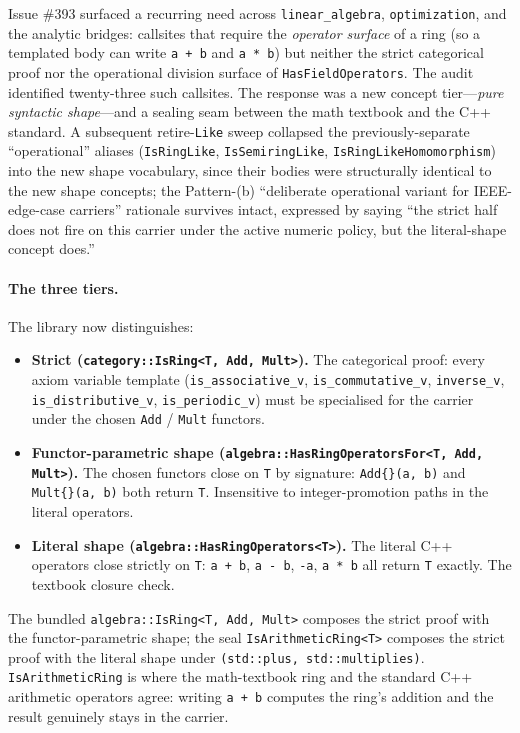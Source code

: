 \documentclass[11pt, a4paper]{report}
\begin{document}
Issue \#393 surfaced a recurring need across \texttt{linear\_algebra}, \texttt{optimization}, and the analytic bridges: callsites that require the \emph{operator surface} of a ring (so a templated body can write \texttt{a + b} and \texttt{a * b}) but neither the strict categorical proof nor the operational division surface of \texttt{HasFieldOperators}. The audit identified twenty-three such callsites. The response was a new concept tier---\emph{pure syntactic shape}---and a sealing seam between the math textbook and the C++ standard. A subsequent retire-\texttt{Like} sweep collapsed the previously-separate ``operational'' aliases (\texttt{IsRingLike}, \texttt{IsSemiringLike}, \texttt{IsRingLikeHomomorphism}) into the new shape vocabulary, since their bodies were structurally identical to the new shape concepts; the Pattern-(b) ``deliberate operational variant for IEEE-edge-case carriers'' rationale survives intact, expressed by saying ``the strict half does not fire on this carrier under the active numeric policy, but the literal-shape concept does.''

\paragraph{The three tiers.} The library now distinguishes:

\begin{itemize}
  \item \textbf{Strict (\texttt{category::IsRing<T, Add, Mult>}).} The categorical proof: every axiom variable template (\texttt{is\_associative\_v}, \texttt{is\_commutative\_v}, \texttt{inverse\_v}, \texttt{is\_distributive\_v}, \texttt{is\_periodic\_v}) must be specialised for the carrier under the chosen \texttt{Add} / \texttt{Mult} functors.
  \item \textbf{Functor-parametric shape (\texttt{algebra::HasRingOperatorsFor<T, Add, Mult>}).} The chosen functors close on \texttt{T} by signature: \texttt{Add\{\}(a, b)} and \texttt{Mult\{\}(a, b)} both return \texttt{T}. Insensitive to integer-promotion paths in the literal operators.
  \item \textbf{Literal shape (\texttt{algebra::HasRingOperators<T>}).} The literal C++ operators close strictly on \texttt{T}: \texttt{a + b}, \texttt{a - b}, \texttt{-a}, \texttt{a * b} all return \texttt{T} exactly. The textbook closure check.
\end{itemize}

The bundled \texttt{algebra::IsRing<T, Add, Mult>} composes the strict proof with the functor-parametric shape; the seal \texttt{IsArithmeticRing<T>} composes the strict proof with the literal shape under \texttt{(std::plus, std::multiplies)}. \texttt{IsArithmeticRing} is where the math-textbook ring and the standard C++ arithmetic operators agree: writing \texttt{a + b} computes the ring's addition and the result genuinely stays in the carrier.
\end{document}
